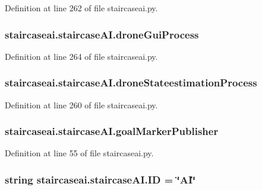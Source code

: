 Definition at line 262 of file staircaseai.\-py.

\hypertarget{classstaircaseai_1_1staircaseAI_ac4392e3c93f4aedf23195b659ccef0c1}{
\subsubsection[{drone\-Gui\-Process}]{\setlength{\rightskip}{0pt plus 5cm}staircaseai.\-staircase\-A\-I.\-drone\-Gui\-Process}}\label{classstaircaseai_1_1staircaseAI_ac4392e3c93f4aedf23195b659ccef0c1}


Definition at line 264 of file staircaseai.\-py.

\hypertarget{classstaircaseai_1_1staircaseAI_a7e495d7bf55a5c90c7b6c342d93e3f58}{
\subsubsection[{drone\-Stateestimation\-Process}]{\setlength{\rightskip}{0pt plus 5cm}staircaseai.\-staircase\-A\-I.\-drone\-Stateestimation\-Process}}\label{classstaircaseai_1_1staircaseAI_a7e495d7bf55a5c90c7b6c342d93e3f58}


Definition at line 260 of file staircaseai.\-py.

\hypertarget{classstaircaseai_1_1staircaseAI_ae21365d23660c43e89c13ef633c7fe65}{
\subsubsection[{goal\-Marker\-Publisher}]{\setlength{\rightskip}{0pt plus 5cm}staircaseai.\-staircase\-A\-I.\-goal\-Marker\-Publisher}}\label{classstaircaseai_1_1staircaseAI_ae21365d23660c43e89c13ef633c7fe65}


Definition at line 55 of file staircaseai.\-py.

\hypertarget{classstaircaseai_1_1staircaseAI_a5eacd7c55a1736b84c4d08031c9c8dbc}{
\subsubsection[{I\-D}]{\setlength{\rightskip}{0pt plus 5cm}string staircaseai.\-staircase\-A\-I.\-I\-D = \char`\"{}A\-I\char`\"{}\hspace{0.3cm}{\ttfamily [static]}}}\label{classstaircaseai_1_1staircaseAI_a5eacd7c55a1736b84c4d08031c9c8dbc}


